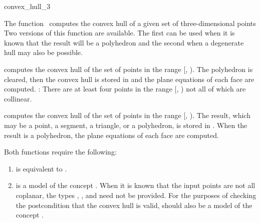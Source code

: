 \begin{ccRefFunction}{convex_hull_3}

\ccDefinition

The function \ccRefName\ computes the convex hull of a given set of 
three-dimensional points 
Two versions of this function 
are available.  The first can be used when it is known that the result
will be a polyhedron and the second when a degenerate hull
may also be possible.


{
computes the convex hull of the set of points in the range
[, ).  The polyhedron  is cleared, then
the convex hull is stored in  
and the plane equations of each face are computed.
\ccPrecond: There are at least four points in the range 
[, ) not all of which are collinear.
}

{
computes the convex hull of the set of points in the range
[, ).  The result, which may be a point, a segment,
a triangle, or a polyhedron, is stored in .  When
the result is a polyhedron, the plane equations of each face are computed.
}

Both functions require the following:
\begin{enumerate}
   \item {} is equivalent to .
   \item {} is a model of the concept 
         .  When it is known that
         the input points are not all coplanar, the types , 
         , and  need not be provided.
         For the purposes of checking the postcondition that the convex hull
         is valid,  should also be a model of the concept
         .
\end{enumerate}


\end{ccRefFunction}
